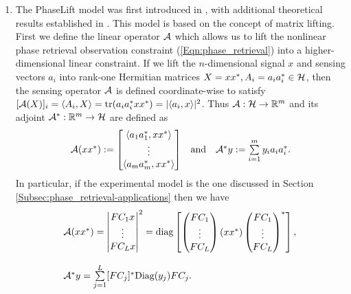 \begin{enumerate}

\item

The PhaseLift model was first introduced in \cite{DBLP:journals/siamis/CandesESV13}, with additional theoretical results established in \cite{candes2013phaselift}.  This model is based on the concept of matrix lifting.  First we define the linear operator ${\mathcal A}$ which allows us to lift the nonlinear phase retrieval observation constraint (\ref{Eqn:phase_retrieval}) into a higher-dimensional linear constraint.  If we lift the $n$-dimensional signal $x$ and sensing vectors $a_i$ into rank-one Hermitian matrices $X = xx^*, A_i = a_ia_i^* \in {\mathcal H}$, then the sensing operator ${\mathcal A}$ is defined coordinate-wise to satisfy $[{\mathcal A} (X)]_i = \langle A_i, X \rangle = \mathrm{tr}( a_i a_i^* xx^* )= | \langle a_i, x \rangle |^2$.  Thus ${\mathcal A}: {\mathcal H} \rightarrow {\mathbb R}^m$ and its adjoint ${\mathcal A}^* : {\mathbb R}^m \rightarrow {\mathcal H}$ are defined as
\begin{equation} 			\label{Eqn:A_definition}
\begin{array}{lcr}
{\mathcal A}(xx^*)
	:= \begin{bmatrix} \langle a_1 a_1^*, xx^* \rangle \\ \vdots \\ \langle a_m a_m^*, xx^* \rangle \end{bmatrix}
		
	& 	\text{and}
		&	{\mathcal A}^*y
			  := \sum\limits_{\substack{i = 1}}^{\substack{m}} y_ia_ia_i^*.
\end{array}
\end{equation}
In particular, if the experimental model is the one discussed in Section \ref{Subsec:phase_retrieval-applications} then we have
\begin{equation} 			\label{Eqn:A_definition_with_masks}
\begin{array}{l}
{\mathcal A}(xx^*)
		= \begin{vmatrix}
				FC_1x \\ \vdots \\ FC_Lx
			\end{vmatrix}^2
			= \textnormal{diag}\begin{bmatrix}
			\begin{pmatrix}
			FC_1 \\ \vdots \\ FC_L
			\end{pmatrix}
		 	(xx^*)
	 		\begin{pmatrix}
			FC_1 \\ \vdots \\ FC_L
		 	\end{pmatrix}^*
		\end{bmatrix},
									\\
									\\
{\mathcal A}^*y
			  =\sum\limits_{\substack{j=1}}^{\substack{L}}
					[FC_j]^* \textnormal{Diag}(y_j) F C_j.
\end{array}
\end{equation}





\end{enumerate}
